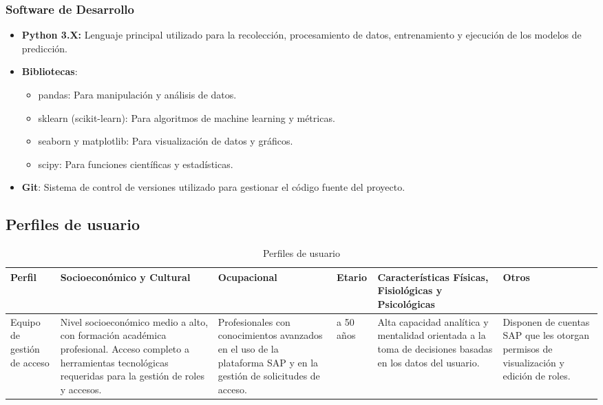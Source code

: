 \documentclass[11pt,letterpaper]{article}
\begin{document}
\subsubsection{Software de Desarrollo}
\begin{itemize}
    \item \textbf{Python 3.X: }Lenguaje principal utilizado para la recolección, procesamiento de datos, entrenamiento y ejecución de los modelos de predicción.

    \item
      \textbf{Bibliotecas}:
    
      \begin{itemize}
      \tightlist
      \item
        pandas: Para manipulación y análisis de datos.
      \item
        sklearn (scikit-learn): Para algoritmos de machine learning y
        métricas.
      \item
        seaborn y matplotlib: Para visualización de datos y gráficos.
      \item
        scipy: Para funciones científicas y estadísticas.
      \end{itemize}

    \item \textbf{Git}: Sistema de control de versiones utilizado para gestionar el código fuente del proyecto.
\end{itemize}

\subsection{Perfiles de usuario}

\begin{table}[H]  %
\centering
\caption{Perfiles de usuario}
\label{tab:P_usuario}
\begin{tabular}{|>{\raggedright\arraybackslash}m{2cm}|
                >{\raggedright\arraybackslash}m{3cm}|
                >{\raggedright\arraybackslash}m{3cm}|
                >{\raggedright\arraybackslash}m{2cm}|
                >{\raggedright\arraybackslash}m{3cm}|
                >{\raggedright\arraybackslash}m{3cm}|}


    \hline
    Perfil & Socioeconómico y Cultural & Ocupacional &Etario &Características Físicas,
Fisiológicas y
Psicológicas &Otros\\
     \hline
     Equipo de gestión de acceso      & Nivel socioeconómico medio a alto, con formación académica profesional. Acceso completo a herramientas tecnológicas requeridas para la gestión de roles y accesos.  & Profesionales con conocimientos avanzados en el uso de la plataforma SAP y en la gestión de solicitudes de acceso. &25 a 50 años & Alta capacidad analítica y mentalidad orientada a la toma de decisiones basadas en los datos del usuario. &Disponen de cuentas SAP que les otorgan permisos de visualización y edición de roles. \\
     \hline
    
\end{tabular}
\end{table}
\end{document}
